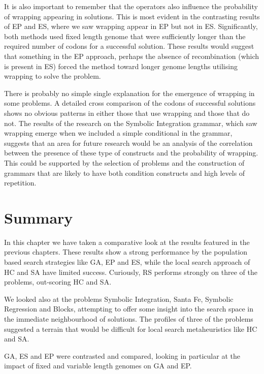 It is also important to remember that the operators also influence the probability of wrapping appearing in solutions. This is most evident in the contrasting results of EP and ES, where we saw wrapping appear in EP  but not in ES. Significantly, both methods used fixed length genome that were sufficiently longer than the required number of codons for a successful solution. These results would suggest that something in the EP approach, perhaps the absence of recombination (which is present in ES) forced the method toward longer genome lengths utilising wrapping to solve the problem. 

There is probably no simple single explanation for the emergence  of wrapping in some problems.  A detailed cross comparison of the codons of successful solutions shows no obvious patterns in either those that use wrapping and those that do not. The results of the research on the Symbolic Integration grammar, which saw wrapping emerge when we included a simple conditional in the grammar, suggests that an area for future research would be an analysis of the correlation between the presence of these type of constructs and the probability of wrapping. This could be supported by the selection of problems and the construction of grammars that are likely to have both condition constructs and high levels of repetition. 



\section{Summary}
In this chapter we have taken a comparative look at the results featured in the previous chapters. These results show a strong performance by the population based search strategies like GA, EP and ES, while the local search approach of HC and SA have limited success. Curiously, RS performs strongly on three of the problems, out-scoring HC and SA.

We looked also at the problems Symbolic Integration, Santa Fe, Symbolic Regression and Blocks, attempting to offer some insight into the search space in the immediate neighbourhood of solutions. The profiles of three of the problems suggested a terrain that would be difficult for local search metaheuristics like HC and SA.

GA, ES and EP were contrasted and compared, looking in particular at the impact of fixed and variable length genomes on GA and EP.

